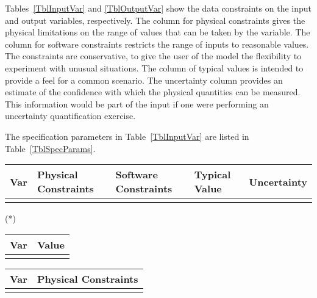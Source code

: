 \documentclass[12pt]{article}
\begin{document}
Tables~\ref{TblInputVar} and \ref{TblOutputVar} show the data constraints on the
input and output variables, respectively.  The column for physical constraints gives
the physical limitations on the range of values that can be taken by the
variable.  The column for software constraints restricts the range of inputs to
reasonable values.  The constraints are conservative, to give the user of the
model the flexibility to experiment with unusual situations.  The column of
typical values is intended to provide a feel for a common scenario.  The
uncertainty column provides an estimate of the confidence with which the
physical quantities can be measured.  This information would be part of the
input if one were performing an uncertainty quantification exercise.

The specification parameters in Table~\ref{TblInputVar} are listed in
Table~\ref{TblSpecParams}.

\begin{table}[!h]
	  \caption{Input Variables} \label{TblInputVar}
	  \renewcommand{\arraystretch}{1.2}
	\noindent \begin{longtable*}{l l l l c} 
		  \toprule
		  \textbf{Var} & \textbf{Physical Constraints} & \textbf{Software Constraints} &
		                             \textbf{Typical Value} & \textbf{Uncertainty}\\
		  \midrule 
		  && &
		  \\
		  \bottomrule
	\end{longtable*}
\end{table}

\noindent 
\begin{description}
\item[(*)] 
\end{description}

\begin{table}[!h]
	\caption{Specification Parameter Values} \label{TblSpecParams}
	\renewcommand{\arraystretch}{1.2}
	\noindent \begin{longtable*}{l l} 
	  \toprule
	  \textbf{Var} & \textbf{Value} \\
	  \midrule 
	   & \\
	  \bottomrule
	\end{longtable*}
\end{table}

\begin{table}[!h]
	\caption{Output Variables} \label{TblOutputVar}
	\renewcommand{\arraystretch}{1.2}
	\noindent \begin{longtable*}{l l} 
	  \toprule
	  \textbf{Var} & \textbf{Physical Constraints} \\
	  \midrule 
	   & 
	  \\
	  \bottomrule
	\end{longtable*}
\end{table}
\end{document}
